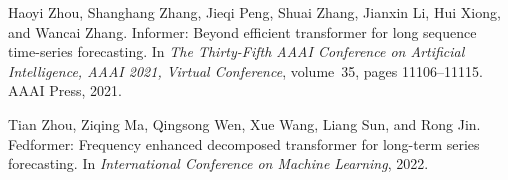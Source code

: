 \documentclass[10pt,twocolumn,letterpaper]{article}
\begin{document}
\begin{thebibliography}{10}
Haoyi Zhou, Shanghang Zhang, Jieqi Peng, Shuai Zhang, Jianxin Li, Hui Xiong,
  and Wancai Zhang.
\newblock Informer: Beyond efficient transformer for long sequence time-series
  forecasting.
\newblock In {\em The Thirty-Fifth {AAAI} Conference on Artificial
  Intelligence, {AAAI} 2021, Virtual Conference}, volume~35, pages
  11106--11115. {AAAI} Press, 2021.

Tian Zhou, Ziqing Ma, Qingsong Wen, Xue Wang, Liang Sun, and Rong Jin.
\newblock Fedformer: Frequency enhanced decomposed transformer for long-term
  series forecasting.
\newblock In {\em International Conference on Machine Learning}, 2022.

\end{thebibliography}
 
\end{document}
